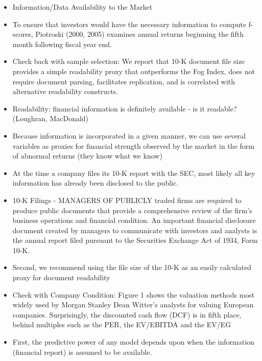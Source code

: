 \documentclass[12pt]{article}
\begin{document}
    \begin{itemize}

        \item Information/Data Availability to the Market
        
        \item To ensure that investors would have the necessary information to compute f-scores, Piotroski (2000, 2005) examines annual returns beginning the fifth month following fiscal year end. \citep{Choi2012}
        
        \item Check back with sample selection: We report that 10-K document file size provides a simple readability proxy that outperforms the Fog Index, does not require document parsing, facilitates replication, and is correlated with alternative readability constructs.\citep{Loughran2014}

        \item Readability: financial information is definitely available - is it readable? (Loughran, MacDonald)
        
        \item Because information is incorporated in a given manner, we can use several variables as proxies for financial strength observed by the market in the form of abnormal returns (they know what we know)
        
        \item At the time a company files its 10-K report with the SEC, most likely all key information has already been disclosed to the public.\citep{You2009}
        
        \item 10-K Filings - MANAGERS OF PUBLICLY traded firms are required to produce public documents that provide a comprehensive review of the firm’s business operations and financial condition. An important financial disclosure document created by managers to communicate with investors and analysts is the annual report filed pursuant to the Securities Exchange Act of 1934, Form 10-K.\citep{Loughran2014}

        \item Second, we recommend using the file size of the 10-K as an easily calculated proxy for document readability \citep{Loughran2014}

        \item Check with Company Condition: Figure 1 shows the valuation methods most widely used by Morgan Stanley Dean Witter’s analysts for valuing European companies. Surprisingly, the discounted cash flow (DCF) is in fifth place, behind multiples such as the PER, the EV/EBITDA and the EV/EG \citep{Fernandez2001}
        
        \item First, the predictive power of any model depends upon when the information (financial report) is assumed to be available. \citep{Ohlson1980}
    \end{itemize}
\end{document}
